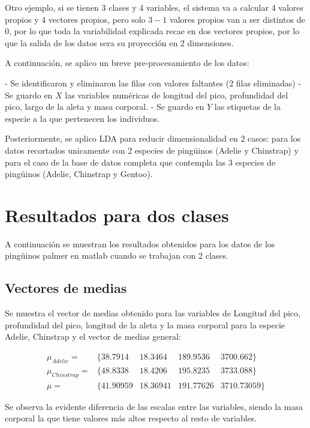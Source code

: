 \documentclass[11pt, letterpaper]{article}
\begin{document}
Otro ejemplo, si se tienen 3 clases y 4 variables, el sistema va a calcular 4 valores propios y 4 vectores propios, pero solo $3-1$ valores propios van a ser distintos de 0, por lo que toda la variabilidad explicada recae en dos vectores propios, por lo que la salida de los datos sera su proyección en 2 dimensiones.

\newpage

A continuación, se aplico un breve pre-procesamiento de los datos:

- Se identificaron y eliminaron las filas con valores faltantes (2 filas eliminadas)
- Se guardo en $X$  las variables numéricas de longitud del pico, profundidad del pico, largo de la aleta y masa corporal.
- Se guardo en $Y$ las etiquetas de la especie a la que pertenecen los individuos.

Posteriormente, se aplico LDA para reducir dimensionalidad en 2 casos: para los datos recortados unicamente con 2 especies de pingüinos (Adelie y Chinstrap) y para el caso de la base de datos completa que contempla las 3 especies de pingüinos (Adelie, Chinstrap y Gentoo).
	
\newpage
	
\section{Resultados para dos clases}

A continuación se muestran los resultados obtenidos para los datos de los pingüinos palmer en matlab cuando se trabajan con 2 clases. 

\subsection{Vectores de medias}

Se muestra el vector de medias obtenido para las variables de Longitud del pico, profundidad del pico, longitud de la aleta y la masa corporal para la especie Adelie, Chinstrap y el vector de medias general:

$$
\begin{matrix}
	\mu_{Adelie} =  &\{38.7914 & 18.3464 & 189.9536 & 3700.662\}	 \\
	\mu_{Chinstrap} = & \{48.8338 & 18.4206 & 195.8235 & 3733.088\}	 \\
	\mu = & \{41.90959 & 18.36941 & 191.77626 & 3710.73059 \}	 
\end{matrix}
$$


Se observa la evidente diferencia de las escalas entre las variables, siendo la masa corporal la que tiene valores más altos respecto al resto de variables.
\end{document}
